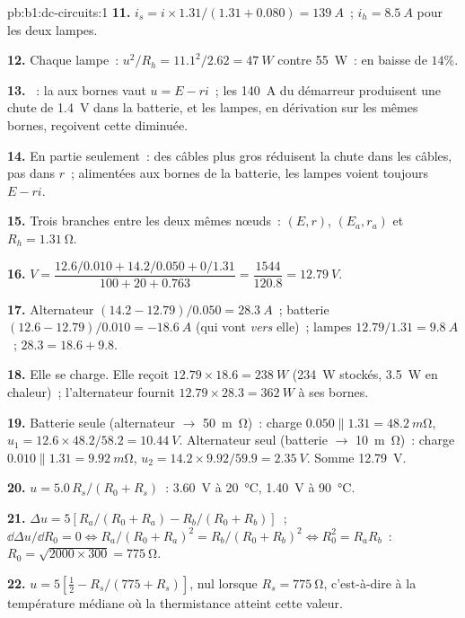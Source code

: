 \begin{solution}{pb:b1:dc-circuits:1}
\textbf{11.} $i_s = i \times 1.31/(1.31 + 0.080) = \qty{139}{A}$~; $i_h =
\qty{8.5}{A}$ pour les deux lampes.

\textbf{12.} Chaque lampe~: $u^2/R_h = 11.1^2/2.62 = \qty{47}{W}$ contre
\qty{55}{W}~: en baisse de $14\%$.

\textbf{13.} ~: la  aux bornes vaut $u = E - ri$~;
les \qty{140}{A} du démarreur produisent une chute de \qty{1.4}{V} dans
la batterie, et les lampes, en dérivation sur les mêmes bornes,
reçoivent cette  diminuée.

\textbf{14.} En partie seulement~: des câbles plus gros réduisent la
chute dans les câbles, pas dans $r$~; alimentées aux bornes de la
batterie, les lampes voient toujours $E - ri$.

\textbf{15.} Trois branches entre les deux mêmes nœuds~: $(E, r)$,
$(E_a, r_a)$ et $R_h = \qty{1.31}{\ohm}$.

\textbf{16.} $V = \dfrac{12.6/0.010 + 14.2/0.050 + 0/1.31}{100 + 20 + 0.763}
= \dfrac{1544}{120.8} = \qty{12.79}{V}$.

\textbf{17.} Alternateur $(14.2 - 12.79)/0.050 = \qty{28.3}{A}$~; batterie
$(12.6 - 12.79)/0.010 = \qty{-18.6}{A}$ (qui vont \emph{vers} elle)~; lampes
$12.79/1.31 = \qty{9.8}{A}$~; $28.3 = 18.6 + 9.8$.

\textbf{18.} Elle se charge. Elle reçoit $12.79 \times 18.6 = \qty{238}{W}$
(\qty{234}{W} stockés, \qty{3.5}{W} en chaleur)~; l'alternateur fournit
$12.79 \times 28.3 = \qty{362}{W}$ à ses bornes.

\textbf{19.} Batterie seule (alternateur $\to$ \qty{50}{m\ohm})~: charge
$0.050 \parallel 1.31 = \qty{48.2}{m\ohm}$, $u_1 = 12.6 \times 48.2/58.2 =
\qty{10.44}{V}$. Alternateur seul (batterie $\to$ \qty{10}{m\ohm})~: charge
$0.010 \parallel 1.31 = \qty{9.92}{m\ohm}$, $u_2 = 14.2 \times 9.92/59.9 =
\qty{2.35}{V}$. Somme \qty{12.79}{V}.

\textbf{20.} $u = 5.0\,R_s/(R_0 + R_s)$~: \qty{3.60}{V} à
\qty{20}{\degreeCelsius}, \qty{1.40}{V} à \qty{90}{\degreeCelsius}.

\textbf{21.} $\Delta u = 5[R_a/(R_0 + R_a) - R_b/(R_0 + R_b)]$~;
$\dd\Delta u/\dd R_0 = 0 \Leftrightarrow R_a/(R_0 + R_a)^2 = R_b/(R_0 +
R_b)^2 \Leftrightarrow R_0^2 = R_aR_b$~: $R_0 = \sqrt{2000 \times 300} =
\qty{775}{\ohm}$.

\textbf{22.} $u = 5[\tfrac12 - R_s/(775 + R_s)]$, nul lorsque $R_s =
\qty{775}{\ohm}$, c'est-à-dire à la température médiane où la
thermistance atteint cette valeur.


\end{solution}

